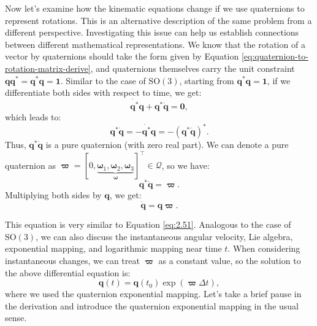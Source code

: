 Now let's examine how the kinematic equations change if we use quaternions to represent rotations. This is an alternative description of the same problem from a different perspective. Investigating this issue can help us establish connections between different mathematical representations. We know that the rotation of a vector by quaternions should take the form given by Equation \eqref{eq:quaternion-to-rotation-matrix-derive}, and quaternions themselves carry the unit constraint $\mathbf{q}\mathbf{q}^*=\mathbf{q}^*\mathbf{q} = \mathbf{1}$. Similar to the case of $\mathrm{SO}(3)$, starting from $\mathbf{q}^* 
\mathbf{q} = \mathbf{1}$, if we differentiate both sides with respect to time, we get:
\begin{equation}\label{key}
	\dot{\mathbf{q}^*} \mathbf{q} +\mathbf{q}^* \dot{\mathbf{q}} = \mathbf{0},
\end{equation}
which leads to:
\begin{equation}\label{key}
	\mathbf{q}^* \dot{\mathbf{q}} = - \dot{\mathbf{q}^*} \mathbf{q} = -(\mathbf{q}^* \dot{\mathbf{q}})^*.
\end{equation}
Thus, $\mathbf{q}^* 
\dot{\mathbf{q}}$ is a pure quaternion (with zero real part). We can denote a pure quaternion as $\boldsymbol{\varpi } = 
[0, \underbrace{\boldsymbol{\omega}_1, \boldsymbol{\omega}_2, 
	\boldsymbol{\omega}_3}_{\boldsymbol{\omega}}]^\top \in \mathcal{Q}$, so we have:
\begin{equation}
	\mathbf{q}^* \dot{\mathbf{q}} = \boldsymbol{\varpi}.
\end{equation}
Multiplying both sides by $\mathbf{q}$, we get:
\begin{equation}\label{eq:2.59}
	\dot{\mathbf{q}} = \mathbf{q} \boldsymbol{\varpi}.
\end{equation}

This equation is very similar to Equation \eqref{eq:2.51}. Analogous to the case of $\mathrm{SO}(3)$, we can also discuss the instantaneous angular velocity, Lie algebra, exponential mapping, and logarithmic mapping near time $t$. When considering instantaneous changes, we can treat $\boldsymbol{\varpi}$ as a constant value, so the solution to the above differential equation is:
\begin{equation}\label{key}
	\mathbf{q}(t) = \mathbf{q}(t_0) \exp(\boldsymbol{\varpi} \Delta t),
\end{equation}
where we used the quaternion exponential mapping. Let's take a brief pause in the derivation and introduce the quaternion exponential mapping in the usual sense.

